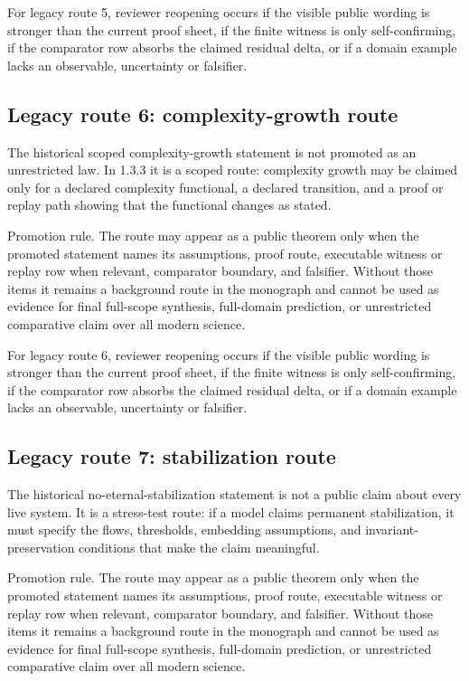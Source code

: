 For legacy route 5, reviewer reopening occurs if the visible public wording is stronger than the current proof sheet, if the finite witness is only self-confirming, if the comparator row absorbs the claimed residual delta, or if a domain example lacks an observable, uncertainty or falsifier.


\subsection{Legacy route 6: complexity-growth route}

The historical scoped complexity-growth statement is not promoted as an unrestricted law. In 1.3.3 it is a scoped route: complexity growth may be claimed only for a declared complexity functional, a declared transition, and a proof or replay path showing that the functional changes as stated.


Promotion rule. The route may appear as a public theorem only when the promoted statement names its assumptions, proof route, executable witness or replay row when relevant, comparator boundary, and falsifier. Without those items it remains a background route in the monograph and cannot be used as evidence for final full-scope synthesis, full-domain prediction, or unrestricted comparative claim over all modern science.


For legacy route 6, reviewer reopening occurs if the visible public wording is stronger than the current proof sheet, if the finite witness is only self-confirming, if the comparator row absorbs the claimed residual delta, or if a domain example lacks an observable, uncertainty or falsifier.


\subsection{Legacy route 7: stabilization route}

The historical no-eternal-stabilization statement is not a public claim about every live system. It is a stress-test route: if a model claims permanent stabilization, it must specify the flows, thresholds, embedding assumptions, and invariant-preservation conditions that make the claim meaningful.


Promotion rule. The route may appear as a public theorem only when the promoted statement names its assumptions, proof route, executable witness or replay row when relevant, comparator boundary, and falsifier. Without those items it remains a background route in the monograph and cannot be used as evidence for final full-scope synthesis, full-domain prediction, or unrestricted comparative claim over all modern science.


